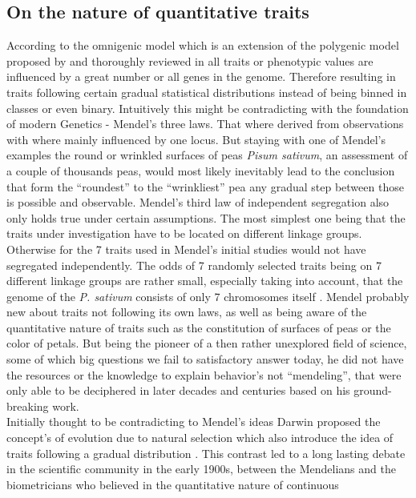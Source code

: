 \subsection{On the nature of quantitative traits} \label{quan} According to the omnigenic model which is an
extension of the polygenic model proposed by \cite{boyle2017expanded} and thoroughly reviewed in
\cite{timpson2018} all traits or phenotypic values are influenced by a great number or all genes in the
genome. Therefore resulting in traits following certain gradual statistical distributions instead of being
binned in classes or even binary. Intuitively this might be contradicting with the foundation of modern
Genetics - Mendel's three laws. That where derived from observations with where mainly influenced by one
locus. But staying with one of Mendel's examples the round or wrinkled surfaces of peas \textit{Pisum
 sativum}, an assessment of a couple of thousands peas, would most likely inevitably lead to the conclusion
that form the ``roundest'' to the ``wrinkliest'' pea any gradual step between those is possible and
observable. Mendel's third law of independent segregation also only holds true under certain assumptions. The
most simplest one being that the traits under investigation have to be located on different linkage
groups. Otherwise for the 7 traits used in Mendel's initial studies would not have segregated
independently. The odds of 7 randomly selected traits being on 7 different linkage groups are rather small,
especially taking into account, that the genome of the \textit{P. sativum} consists of only 7 chromosomes
itself \cite{kalo2004}. Mendel probably new about traits not following its own laws, as well as being aware of
the quantitative nature of traits such as the constitution of surfaces of peas or the color of petals. But
being the pioneer of a then rather unexplored field of science, some of which big questions we fail to
satisfactory answer today, he did not have the resources or the knowledge to explain behavior's not
``mendeling'', that were only able to be deciphered in later decades and centuries
based on his ground-breaking work. \\
Initially thought to be contradicting to Mendel's ideas Darwin proposed the concept's of evolution due to
natural selection which also introduce the idea of traits following a gradual distribution
\cite{darwin1859}. This contrast led to a long lasting debate in the scientific community in the early 1900s,
between the Mendelians and the biometricians who believed in the quantitative nature of continuous
